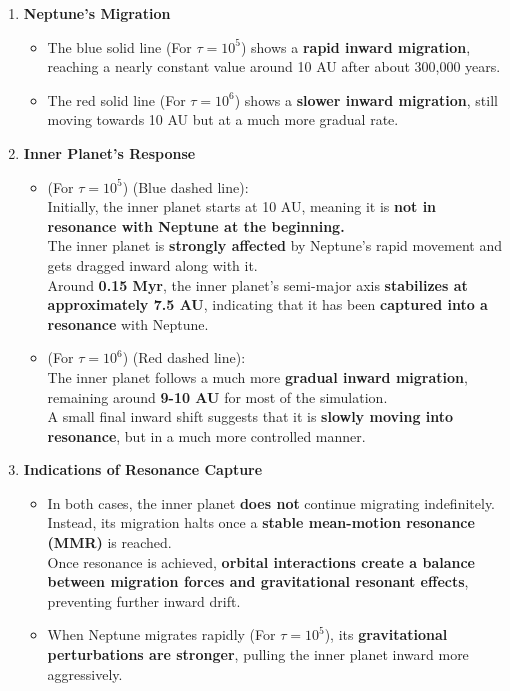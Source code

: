 \documentclass[12pt,a4paper]{article}
\begin{document}
\begin{enumerate}
    \item \textbf{Neptune's Migration}
    \begin{itemize}
      \item The blue solid line (For \(\tau = 10^5\)) shows a \textbf{rapid inward migration}, reaching a nearly constant value around 10 AU after about 300,000 years.
      \item The red solid line (For \(\tau = 10^6\)) shows a \textbf{slower inward migration}, still moving towards 10 AU but at a much more gradual rate.
    \end{itemize}
    \item \textbf{Inner Planet's Response}
    \begin{itemize}
      \item (For \(\tau = 10^5\)) (Blue dashed line):
      \\ Initially, the inner planet starts at 10 AU, meaning it is \textbf{not in resonance with Neptune at the beginning.} 
      \\ The inner planet is \textbf{strongly affected} by Neptune’s rapid movement and gets dragged inward along with it. 
      \\ Around \textbf{0.15 Myr}, the inner planet's semi-major axis \textbf{stabilizes at approximately 7.5 AU}, indicating that it has been \textbf{captured into a resonance} with Neptune.
      \item (For \(\tau = 10^6\)) (Red dashed line):
      \\ The inner planet follows a much more \textbf{gradual inward migration}, remaining around \textbf{9-10 AU} for most of the simulation.
      \\ A small final inward shift suggests that it is \textbf{slowly moving into resonance}, but in a much more controlled manner.
    \end{itemize}
    \item \textbf{Indications of Resonance Capture}
    \begin{itemize}
      \item In both cases, the inner planet \textbf{does not} continue migrating indefinitely. Instead, its migration halts once a \textbf{stable mean-motion resonance (MMR)} is reached.
      \\ Once resonance is achieved, \textbf{orbital interactions create a balance between migration forces and gravitational resonant effects}, preventing further inward drift.
      \item When Neptune migrates rapidly (For \(\tau = 10^5\)), its \textbf{gravitational perturbations are stronger}, pulling the inner planet inward more aggressively.

\end{itemize}
\end{enumerate}
\end{document}

